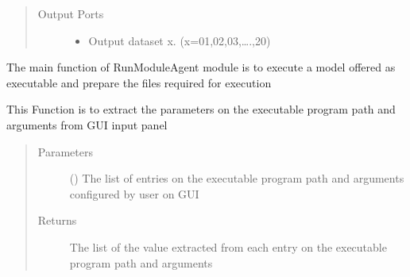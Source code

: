\documentclass[letterpaper,10pt,english]{sphinxmanual}
\begin{document}
\begin{fulllineitems}
\begin{quote}
\begin{description}
\item[{Output Ports}] \leavevmode\begin{itemize}
\item {} 
  Output dataset x. (x=01,02,03,….,20)

\end{itemize}

\end{description}\end{quote}

\begin{fulllineitems}
\label{\detokenize{AgentTools.GenericModelAgent:AgentTools.GenericModelAgent.RunModuleAgent.RunModuleAgent.compute}}
The main function of RunModuleAgent module is to execute a model offered as executable and prepare the files required for execution

\end{fulllineitems}


\begin{fulllineitems}
\label{\detokenize{AgentTools.GenericModelAgent:AgentTools.GenericModelAgent.RunModuleAgent.RunModuleAgent.extract_exe_and_arg}}
This Function is to extract the parameters on the executable program path and arguments from GUI input panel
\begin{quote}\begin{description}
\item[{Parameters}] \leavevmode
{} () \textendash{} The list of entries on the executable program path and arguments configured by user on GUI

\item[{Returns}] \leavevmode
The list of the value extracted from each entry on the executable program path and arguments


\end{description}
\end{quote}
\end{fulllineitems}
\end{fulllineitems}
\end{document}
